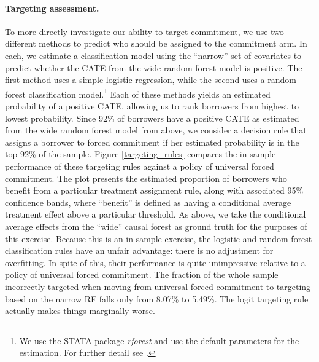 \documentclass[oneside,11pt]{article}
\begin{document}
\paragraph{Targeting assessment.} 

To more directly investigate our ability to target commitment, we use two different methods to predict who should be assigned to the commitment arm. In each, we estimate a classification model using the ``narrow'' set of covariates to predict whether the CATE from the wide random forest model is positive. The first method uses a simple logistic regression, while the second uses a random forest classification model.\footnote{We use the STATA package \textit{rforest} and use the default parameters for the estimation. For further detail see \cite{rforest_stata}.} Each of these methods yields an estimated probability of a positive CATE, allowing us to rank borrowers from highest to lowest probability. Since 92\% of borrowers have a positive CATE as estimated from the wide random forest model from above, we consider a decision rule that assigns a borrower to forced commitment if her estimated probability is in the top 92\% of the sample.
Figure \ref{targeting_rules} compares the in-sample performance of these targeting rules against a policy of universal forced commitment. The plot presents the estimated proportion of borrowers who benefit from a particular treatment assignment rule, along with associated 95\% confidence bands, where ``benefit'' is defined as having a conditional average treatment effect above a particular threshold. As above, we take the conditional average effects from the ``wide'' causal forest as ground truth for the purposes of this exercise. 
Because this is an in-sample exercise, the logistic and random forest classification rules have an unfair advantage: there is no adjustment for overfitting.
In spite of this, their performance is quite unimpressive relative to a policy of universal forced commitment.
The fraction of the whole sample incorrectly targeted when moving from universal forced commitment to targeting based on the narrow RF falls only from 8.07\% to 5.49\%. The logit targeting rule actually makes things marginally worse. 
\end{document}
